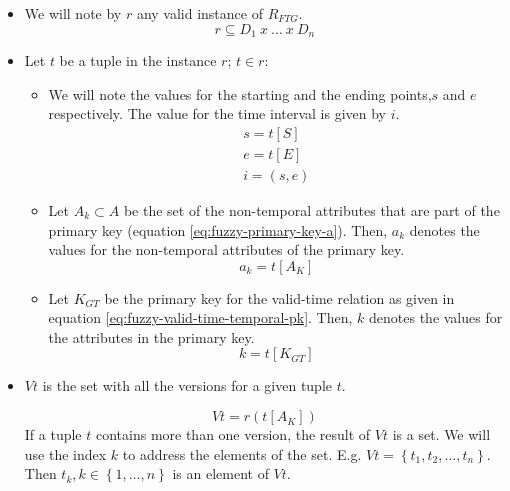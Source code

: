 \begin{definition}
\begin{itemize}
\item We will note by $r$ any valid instance of $R_{FTG}$. 
      \begin{equation}
       \label{eq:fuzzy-valid-time-instance}
      r \subseteq D_1\ x\ \ldots\ x\ D_n
      \end{equation}

\item Let $t$ be a tuple in the instance $r$; $t \in r$:
      \begin{itemize}
      \item We will note the values for the starting and the ending  points,$s$ and $e$  respectively. The value for the time interval is given by $i$.
      \begin{align}
       \label{eq:fuzzy-starting-point}
      s = t\left[S \right]\\
      e = t\left[E \right]\\
      i = \left(s, e\right)
      \end{align}


      \item Let $A_k \subset A$ be the set of the non-temporal attributes that are part of the primary key (equation \eqref{eq:fuzzy-primary-key-a}). Then, $a_k$ denotes the values for the non-temporal attributes of the primary key.
	    \begin{equation}
	     \label{eq:fuzzy-pk-attribute} 
	      a_k = t\left[A_K \right]
	    \end{equation}

    \item Let $K_{GT}$ be the primary key for the valid-time relation as given in equation \eqref{eq:fuzzy-valid-time-temporal-pk}. Then, $k$ denotes the values for the attributes in the primary key.
	  \begin{equation}
	   \label{eq:fuzzy-value-pk}
	  k = t\left[K_{GT} \right]
	  \end{equation}


      \end{itemize}
\item $Vt$ is the set with all the versions for a given tuple $t$.

\begin{equation}
 \label{eq:fuzzy-all-the-versions}
Vt = r\left(t\left[A_K\right] \right)
\end{equation}
If a tuple $t$ contains more than one version, the result of $Vt$ is a set. We will use the index $k$ to address the elements of the set. E.g. $Vt = \left \lbrace t_1, t_2, \ldots, t_n \right \rbrace$. Then $t_k , k \in \left \lbrace 1, \ldots, n \right \rbrace$ is an element of $Vt$.
\end{itemize}


\end{definition}
